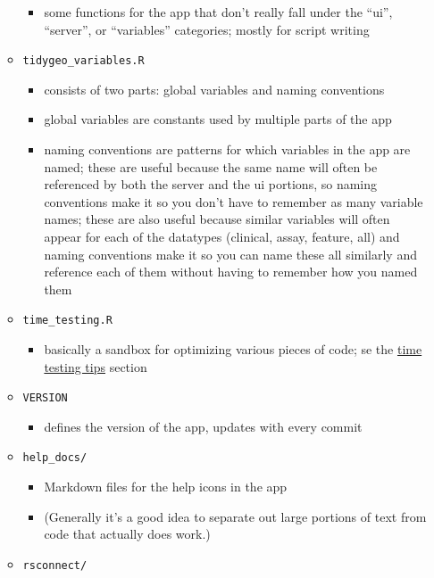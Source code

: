 \documentclass[]{article}
\providecommand{\tightlist}{%
  \setlength{\itemsep}{0pt}\setlength{\parskip}{0pt}}
\begin{document}
\begin{itemize}
\begin{itemize}
    \begin{itemize}
    \tightlist
    \item
      some functions for the app that don't really fall under the
      ``ui'', ``server'', or ``variables'' categories; mostly for script
      writing
    \end{itemize}
  \item
    \texttt{tidygeo\_variables.R}

    \begin{itemize}
    \tightlist
    \item
      consists of two parts: global variables and naming conventions
    \item
      global variables are constants used by multiple parts of the app
    \item
      naming conventions are patterns for which variables in the app are
      named; these are useful because the same name will often be
      referenced by both the server and the ui portions, so naming
      conventions make it so you don't have to remember as many variable
      names; these are also useful because similar variables will often
      appear for each of the datatypes (clinical, assay, feature, all)
      and naming conventions make it so you can name these all similarly
      and reference each of them without having to remember how you
      named them
    \end{itemize}
  \item
    \texttt{time\_testing.R}

    \begin{itemize}
    \tightlist
    \item
      basically a sandbox for optimizing various pieces of code; se the
      \protect\hyperlink{time-testing}{time testing tips} section
    \end{itemize}
  \item
    \texttt{VERSION}

    \begin{itemize}
    \tightlist
    \item
      defines the version of the app, updates with every commit
    \end{itemize}
  \item
    \texttt{help\_docs/}

    \begin{itemize}
    \tightlist
    \item
      Markdown files for the help icons in the app
    \item
      (Generally it's a good idea to separate out large portions of text
      from code that actually does work.)
    \end{itemize}
  \item
    \texttt{rsconnect/}


\end{itemize}
\end{itemize}
\end{document}
